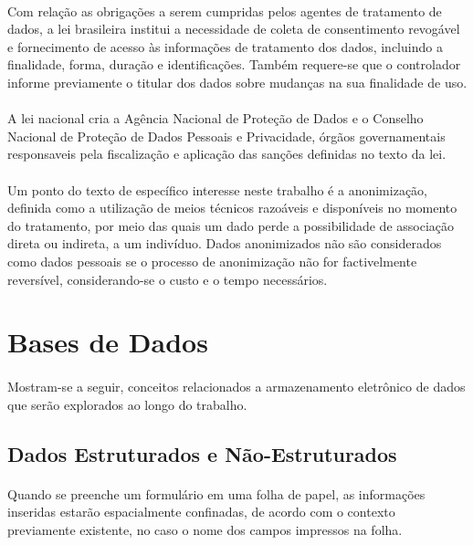 \paragraph{} Com relação as obrigações a serem cumpridas pelos agentes de tratamento de dados, a lei brasileira institui a necessidade de coleta de consentimento revogável e fornecimento de acesso às informações de tratamento dos dados, incluindo a finalidade, forma, duração e identificações. Também
requere-se que o controlador informe previamente o titular dos dados sobre mudanças na sua finalidade de uso. 

\paragraph{} A lei nacional cria a Agência Nacional de Proteção de Dados e o Conselho Nacional de Proteção de Dados Pessoais e Privacidade, órgãos governamentais responsaveis pela fiscalização e aplicação das sanções definidas no texto da lei.

\paragraph{} Um ponto do texto de específico interesse neste trabalho é a anonimização, definida como a utilização de meios técnicos razoáveis e disponíveis no momento do tratamento, por meio das quais um dado perde a possibilidade de associação direta ou indireta, a um indivíduo. Dados anonimizados não são considerados como dados pessoais se o processo de anonimização não for factivelmente reversível, considerando-se o custo e o tempo necessários.


\section{Bases de Dados}

\paragraph{} Mostram-se a seguir, conceitos relacionados a armazenamento eletrônico de dados que serão explorados ao longo do trabalho. 

\subsection{Dados Estruturados e Não-Estruturados}

\paragraph{} Quando se preenche um formulário em uma folha de papel, as informações inseridas estarão espacialmente confinadas, de acordo com o contexto previamente existente, no caso o nome dos campos impressos na folha.

